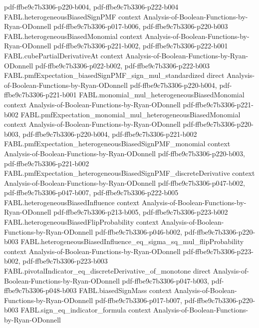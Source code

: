 \begin{theorem}
{    pdf-ffbe9c7b3306-p220-b004,
    pdf-ffbe9c7b3306-p222-b004}
\proofstep
  {FABL.heterogeneousBiasedSignPMF}
  {context}
  {Analysis-of-Boolean-Functions-by-Ryan-ODonnell}
  {pdf-ffbe9c7b3306-p017-b006,
    pdf-ffbe9c7b3306-p220-b003}
\proofstep
  {FABL.heterogeneousBiasedMonomial}
  {context}
  {Analysis-of-Boolean-Functions-by-Ryan-ODonnell}
  {pdf-ffbe9c7b3306-p221-b002,
    pdf-ffbe9c7b3306-p222-b001}
\proofstep
  {FABL.cubePartialDerivativeAt}
  {context}
  {Analysis-of-Boolean-Functions-by-Ryan-ODonnell}
  {pdf-ffbe9c7b3306-p022-b002,
    pdf-ffbe9c7b3306-p222-b003}
\proofstep
  {FABL.pmfExpectation_biasedSignPMF_sign_mul_standardized}
  {direct}
  {Analysis-of-Boolean-Functions-by-Ryan-ODonnell}
  {pdf-ffbe9c7b3306-p220-b004,
    pdf-ffbe9c7b3306-p221-b001}
\proofstep
  {FABL.monomial_mul_heterogeneousBiasedMonomial}
  {context}
  {Analysis-of-Boolean-Functions-by-Ryan-ODonnell}
  {pdf-ffbe9c7b3306-p221-b002}
\proofstep
  {FABL.pmfExpectation_monomial_mul_heterogeneousBiasedMonomial}
  {context}
  {Analysis-of-Boolean-Functions-by-Ryan-ODonnell}
  {pdf-ffbe9c7b3306-p220-b003,
    pdf-ffbe9c7b3306-p220-b004,
    pdf-ffbe9c7b3306-p221-b002}
\proofstep
  {FABL.pmfExpectation_heterogeneousBiasedSignPMF_monomial}
  {context}
  {Analysis-of-Boolean-Functions-by-Ryan-ODonnell}
  {pdf-ffbe9c7b3306-p220-b003,
    pdf-ffbe9c7b3306-p221-b002}
\proofstep
  {FABL.pmfExpectation_heterogeneousBiasedSignPMF_discreteDerivative}
  {context}
  {Analysis-of-Boolean-Functions-by-Ryan-ODonnell}
  {pdf-ffbe9c7b3306-p047-b002,
    pdf-ffbe9c7b3306-p047-b007,
    pdf-ffbe9c7b3306-p222-b005}
\proofstep
  {FABL.heterogeneousBiasedInfluence}
  {context}
  {Analysis-of-Boolean-Functions-by-Ryan-ODonnell}
  {pdf-ffbe9c7b3306-p213-b005,
    pdf-ffbe9c7b3306-p223-b002}
\proofstep
  {FABL.heterogeneousBiasedFlipProbability}
  {context}
  {Analysis-of-Boolean-Functions-by-Ryan-ODonnell}
  {pdf-ffbe9c7b3306-p046-b002,
    pdf-ffbe9c7b3306-p220-b003}
\proofstep
  {FABL.heterogeneousBiasedInfluence_eq_sigma_sq_mul_flipProbability}
  {context}
  {Analysis-of-Boolean-Functions-by-Ryan-ODonnell}
  {pdf-ffbe9c7b3306-p223-b002,
    pdf-ffbe9c7b3306-p223-b003}
\proofstep
  {FABL.pivotalIndicator_eq_discreteDerivative_of_monotone}
  {direct}
  {Analysis-of-Boolean-Functions-by-Ryan-ODonnell}
  {pdf-ffbe9c7b3306-p047-b003,
    pdf-ffbe9c7b3306-p048-b003}
\proofstep
  {FABL.biasedSignMass}
  {context}
  {Analysis-of-Boolean-Functions-by-Ryan-ODonnell}
  {pdf-ffbe9c7b3306-p017-b007,
    pdf-ffbe9c7b3306-p220-b003}
\proofstep
  {FABL.sign_eq_indicator_formula}
  {context}
  {Analysis-of-Boolean-Functions-by-Ryan-ODonnell}

\end{theorem}
